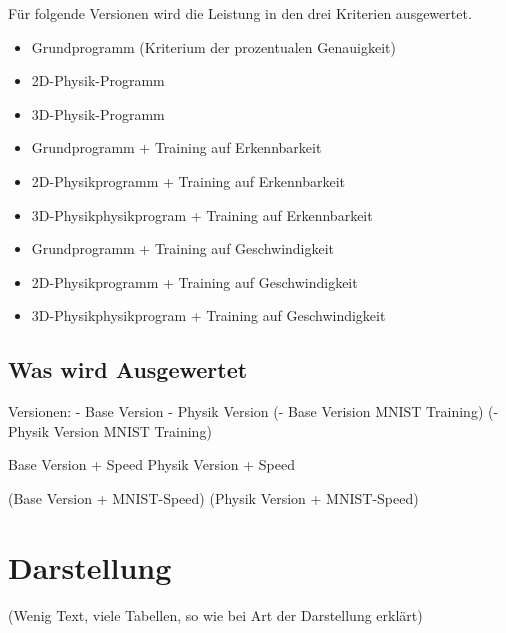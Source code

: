 Für folgende Versionen wird die Leistung in den drei Kriterien ausgewertet.
\begin{itemize}
    \item Grundprogramm (Kriterium der prozentualen Genauigkeit)
    \item 2D-Physik-Programm
    \item 3D-Physik-Programm
    \item Grundprogramm + Training auf Erkennbarkeit
    \item 2D-Physikprogramm + Training auf Erkennbarkeit
    \item 3D-Physikphysikprogram + Training auf Erkennbarkeit
    \item Grundprogramm + Training auf Geschwindigkeit
    \item 2D-Physikprogramm + Training auf Geschwindigkeit
    \item 3D-Physikphysikprogram + Training auf Geschwindigkeit
\end{itemize}









    
\subsection*{Was wird Ausgewertet}
Versionen:
    - Base Version
    - Physik Version
    (- Base Verision MNIST Training)
    (- Physik Version MNIST Training)

    Base Version + Speed 
    Physik Version + Speed 
    
    (Base Version + MNIST-Speed)
    (Physik Version + MNIST-Speed)


\section{Darstellung}
(Wenig Text, viele Tabellen, so wie bei Art der Darstellung erklärt)








